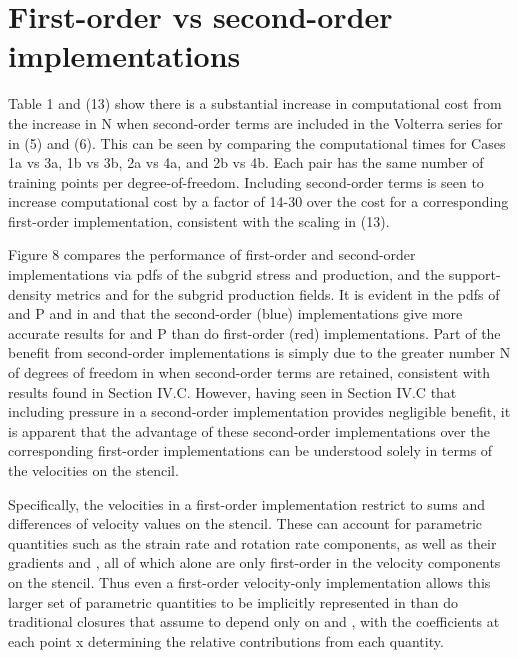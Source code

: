 \section{First-order vs second-order implementations}

Table 1 and (13) show there is a substantial increase in computational cost from the increase in N when second-order terms are included in the Volterra series for   in (5) and (6). This can be seen by comparing the computational times for Cases 1a vs 3a, 1b vs 3b, 2a vs 4a, and 2b vs 4b. Each pair has the same number   of training points per degree-of-freedom. Including second-order terms is seen to increase computational cost by a factor of 14-30 over the cost for a corresponding first-order implementation, consistent with the scaling in (13).  

Figure 8 compares the performance of first-order and second-order implementations via pdfs of the subgrid stress and production, and the support-density metrics   and  for the subgrid production fields. It is evident in the pdfs of   and P and in   and   that the second-order (blue) implementations give more accurate results for   and P than do first-order (red) implementations. Part of the benefit from second-order implementations is simply due to the greater number N of degrees of freedom in   when second-order terms are retained, consistent with results found in Section IV.C. However, having seen in Section IV.C that including pressure in a second-order implementation provides negligible benefit, it is apparent that the advantage of these second-order implementations over the corresponding first-order implementations can be understood solely in terms of the velocities on the stencil. 

Specifically, the velocities in a first-order implementation restrict   to sums and differences of velocity values on the   stencil. These can account for parametric quantities such as the strain rate   and rotation rate   components, as well as their gradients   and  , all of which alone are only first-order in the velocity components on the stencil. Thus even a first-order velocity-only implementation allows this larger set of parametric quantities to be implicitly represented in   than do traditional closures that assume   to depend only on   and  , with the coefficients   at each point x determining the relative contributions from each quantity. 

